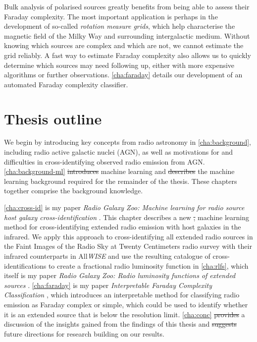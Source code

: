 \documentclass[11pt, a4paper]{book}
\newcommand{\defn}[1]{\emph{#1}}
\providecommand{\DIFaddtex}[1]{{\protect\color{blue}\uwave{#1}}} %
\providecommand{\DIFdeltex}[1]{{\protect\color{red}\sout{#1}}}                      %
\providecommand{\DIFaddbegin}{} %
\providecommand{\DIFaddend}{} %
\providecommand{\DIFdelbegin}{} %
\providecommand{\DIFdelend}{} %
\providecommand{\DIFadd}[1]{\texorpdfstring{\DIFaddtex{#1}}{#1}} %
\providecommand{\DIFdel}[1]{\texorpdfstring{\DIFdeltex{#1}}{}} %
\newcommand{\DIFscaledelfig}{0.5}
\newlength{\DIFdelgraphicswidth} %
\newlength{\DIFdelgraphicsheight} %
\newcommand{\DIFaddincludegraphics}[2][]{{\color{blue}\fbox{\DIFOincludegraphics[#1]{#2}}}} %
\newcommand{\DIFdelincludegraphics}[2][]{%
\sbox{\DIFdelgraphicsbox}{\DIFOincludegraphics[#1]{#2}}%
\settoboxwidth{\DIFdelgraphicswidth}{\DIFdelgraphicsbox} %
\settoboxtotalheight{\DIFdelgraphicsheight}{\DIFdelgraphicsbox} %
\scalebox{\DIFscaledelfig}{%
\parbox[b]{\DIFdelgraphicswidth}{\usebox{\DIFdelgraphicsbox}\\[-\baselineskip] \rule{\DIFdelgraphicswidth}{0em}}\llap{\resizebox{\DIFdelgraphicswidth}{\DIFdelgraphicsheight}{%
\setlength{\unitlength}{\DIFdelgraphicswidth}%
\begin{picture}(1,1)%
\thicklines\linethickness{2pt} %
{\color[rgb]{1,0,0}\put(0,0){\framebox(1,1){}}}%
{\color[rgb]{1,0,0}\put(0,0){\line( 1,1){1}}}%
{\color[rgb]{1,0,0}\put(0,1){\line(1,-1){1}}}%
\end{picture}%
}\hspace*{3pt}}} %
} %
\DeclareRobustCommand{\DIFaddbegin}{\DIFOaddbegin \let\includegraphics\DIFaddincludegraphics} %
\DeclareRobustCommand{\DIFaddend}{\DIFOaddend \let\includegraphics\DIFOincludegraphics} %
\DeclareRobustCommand{\DIFdelbegin}{\DIFOdelbegin \let\includegraphics\DIFdelincludegraphics} %
\DeclareRobustCommand{\DIFdelend}{\DIFOaddend \let\includegraphics\DIFOincludegraphics} %
\begin{document}
    Bulk analysis of polarised sources greatly benefits from being able to assess their Faraday complexity. The most important application is perhaps in the development of so-called \defn{rotation measure grids}, which help characterise the magnetic field of the Milky Way and surrounding intergalactic medium. Without knowing which sources are complex and which are not, we cannot estimate the grid reliably. A fast way to estimate Faraday complexity also allows us to quickly determine which sources may need following up, either with more expensive algorithms or further observations. \autoref{cha:faraday} details our development of an automated Faraday complexity classifier.

\section{Thesis outline}
\label{sec:outline}

We begin by introducing key concepts from radio astronomy in \autoref{cha:background}, including radio active galactic nuclei (AGN), as well as motivations for and difficulties in cross-identifying observed radio emission from AGN. \DIFaddbegin \DIFadd{In }\DIFaddend \autoref{cha:background-ml} \DIFdelbegin \DIFdel{introduces }\DIFdelend \DIFaddbegin \DIFadd{we introduce }\DIFaddend machine learning and \DIFdelbegin \DIFdel{describes }\DIFdelend \DIFaddbegin \DIFadd{describe }\DIFaddend the machine learning background required for the remainder of the thesis. These chapters together comprise the background knowledge.

\autoref{cha:cross-id} is my paper \emph{Radio Galaxy Zoo: Machine learning for radio source host galaxy cross-identification} \citep{alger18radio}. This chapter describes a new \DIFdelbegin \DIFdel{, }\DIFdelend machine learning method for cross-identifying extended radio emission with host galaxies in the infrared. We apply this approach to cross-identifying all extended radio sources in the Faint Images of the Radio Sky at Twenty Centimeters radio survey \citep[FIRST;][]{becker95first} with their infrared counterparts in All\emph{WISE} \citep{cutri2013wiseexplanatory} and use the resulting catalogue of cross-identifications to create a fractional radio luminosity function in \autoref{cha:rlfs}, which itself is my paper \emph{Radio Galaxy Zoo: Radio luminosity functions of extended sources} \citep{alger21rlfs}. \autoref{cha:faraday} is my paper \emph{Interpretable Faraday Complexity Classification} \citep{alger2021interpretable}, which introduces an interpretable method for classifying radio emission as Faraday complex or simple, which could be used to identify whether it is an extended source that is below the resolution limit. \DIFaddbegin \DIFadd{In }\DIFaddend \autoref{cha:conc} \DIFdelbegin \DIFdel{provides }\DIFdelend \DIFaddbegin \DIFadd{we provide }\DIFaddend a discussion of the insights gained from the findings of this thesis and \DIFdelbegin \DIFdel{suggests }\DIFdelend \DIFaddbegin \DIFadd{suggest }\DIFaddend future directions for research building on our results.
\end{document}
